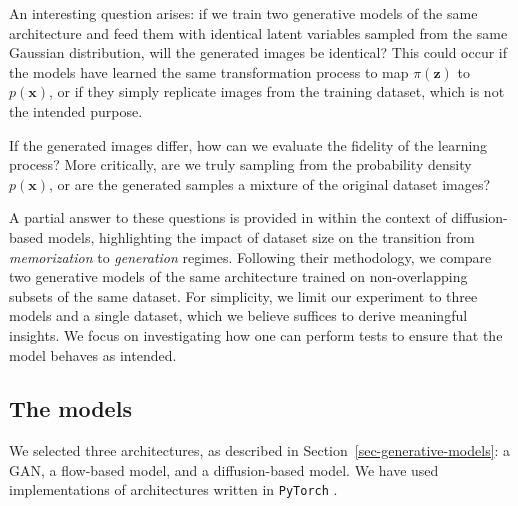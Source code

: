 \documentclass[fleqn,usenatbib]{mnras}
\begin{document}
An interesting question arises: if we train two generative models of the same architecture and feed them with identical latent variables sampled from the same Gaussian distribution, will the generated images be identical? This could occur if the models have learned the same transformation process to map $\pi(\bm{z})$ to $p(\bm{x})$, or if they simply replicate images from the training dataset, which is not the intended purpose. 

If the generated images differ, how can we evaluate the fidelity of the learning process? More critically, are we truly sampling from the probability density $p(\bm{x})$, or are the generated samples a mixture of the original dataset images?

A partial answer to these questions is provided in \cite{kadkhodaie2024generalization} within the context of diffusion-based models, highlighting the impact of dataset size on the transition from \textit{memorization} to \textit{generation} regimes. Following their methodology, we compare two generative models of the same architecture trained on non-overlapping subsets of the same dataset. For simplicity, we limit our experiment to three models and a single dataset, which we believe suffices to derive meaningful insights. 
{\color{red}We focus on investigating how one can perform tests to ensure that the model behaves as intended. 
}

%

%
\subsection{The models}
\label{sec-Exp-Models}
%
We selected three architectures, as described in Section~\ref{sec-generative-models}: a GAN, a flow-based model, and a diffusion-based model. We have used implementations of architectures written in \texttt{PyTorch} \citep{PyTorch2019}. 
\end{document}
